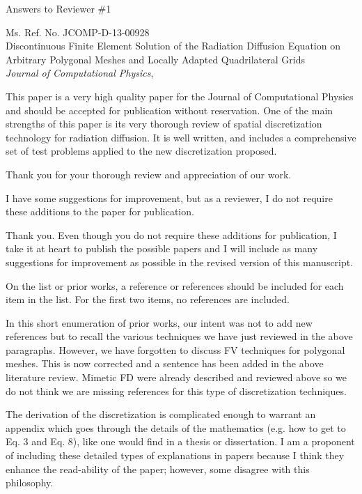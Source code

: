 \documentclass{article}
\begin{document}
\begin{center}
{ \Large Answers to Reviewer \#1}
\end{center}

\bigskip

\noindent Ms. Ref. No. JCOMP-D-13-00928\\
Discontinuous Finite Element Solution of the Radiation Diffusion Equation on Arbitrary Polygonal Meshes and Locally Adapted Quadrilateral Grids\\
{\it Journal of Computational Physics},\\

\bigskip
\bigskip

{
\color{blue}
This paper is a very high quality paper for the Journal of Computational Physics and should be
accepted for publication without reservation. One of the main strengths of this paper is its very thorough
review of spatial discretization technology for radiation diffusion. It is well written, and includes a
comprehensive set of test problems applied to the new discretization proposed.
}

Thank you for your thorough review and appreciation of our work. 
\bigskip


{
\color{blue}
I have some suggestions for improvement, but as a reviewer, I do not require these additions to the paper
for publication.
}


Thank you. Even though you do not require these additions for publication, I take it at heart to publish the 
possible papers and I will include as many suggestions for improvement as possible in the revised version of 
this manuscript.
\bigskip



{
\color{blue}
On the list or prior works, a reference or references should be included for each item in the list. For the
first two items, no references are included.
}


In this short enumeration of prior works, our intent was not to add new references but to recall
the various techniques we have just reviewed in the above paragraphs. However, we have forgotten to 
discuss FV techniques for polygonal meshes. This is now corrected and a sentence has been added in the 
above literature review. Mimetic FD were already described and reviewed above so we do not think we are missing 
references for this type of discretization techniques. 
\bigskip

{
\color{blue}
The derivation of the discretization is complicated enough to warrant an appendix which goes through
the details of the mathematics (e.g. how to get to Eq. 3 and Eq. 8), like one would find in a thesis or
dissertation. I am a proponent of including these detailed types of explanations in papers because I think
they enhance the read-ability of the paper; however, some disagree with this philosophy.
}
\end{document}
